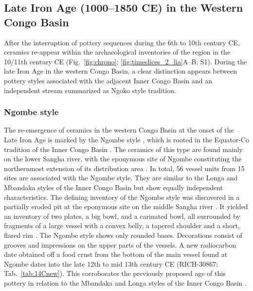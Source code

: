 \documentclass[smallextended,natbib]{svjour3}       %
\begin{document}
\subsection*{Late Iron Age (1000--1850 CE) in the Western Congo Basin}

After the interruption of pottery sequences during the 6th to 10th century CE, ceramics re-appear within the archaeological inventories of the region in the 10/11th century CE (Fig.~\ref{fig:chrono}; \ref{fig:timeslices_2_lia}A--B; S1). During the late Iron Age in the western Congo Basin, a clear distinction appears between pottery styles associated with the adjacent Inner Congo Basin and an independent stream summarized as Ngoko style tradition.

\subsubsection*{Ngombe style}

The re-emergence of ceramics in the western Congo Basin at the onset of the Late Iron Age is marked by the Ngombe style \citep[125--128]{Seidensticker.2021e}, which is rooted in the Equator-Co tradition of the Inner Congo Basin \citep[222 Fig. 4]{Wotzka.1995}. The ceramics of this type are found mainly on the lower Sangha river, with the eponymous site of Ngombe constituting the northernmost extension of its distribution area \citep[127 Fig. 54]{Seidensticker.2021e}. In total, 56 vessel units from 15 sites are associated with the Ngombe style. They are similar to the Longa and Mbandaka styles \citep[121--128, 139--143]{Wotzka.1995} of the Inner Congo Basin but show equally independent characteristics. The defining inventory of the Ngombe style was discovered in a partially eroded pit at the eponymous site on the middle Sangha river \citep[305--306]{Seidensticker.2021e}. It yielded an inventory of two plates, a big bowl, and a carinated bowl, all surrounded by fragments of a large vessel with a convex belly, a tapered shoulder and a short, flared rim \citep[Fig.~\ref{fig:sangha}.10--12;][Pl. 42.15--44.2]{Seidensticker.2021e}. The Ngombe style shows only rounded bases. Decorations consist of grooves and impressions on the upper parts of the vessels. A new radiocarbon date obtained off a food crust from the bottom of the main vessel found at Ngombe dates into the late 12th to mid 13th century CE (RICH-30867; Tab.~\ref{tab:14Cnew}). This corroborates the previously proposed age of this pottery in relation to the Mbandaka and Longa styles of the Inner Congo Basin \citep[Fig.~\ref{fig:chrono}; \ref{fig:timeslices_2_lia}B--C; S1; Tab.~S1;][126--128]{Seidensticker.2021e}. 
\end{document}
